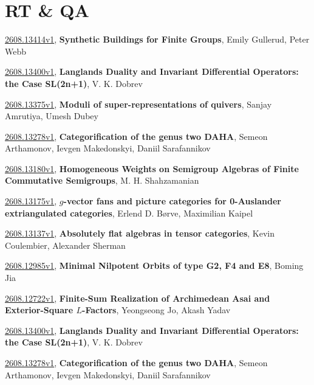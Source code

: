 \documentclass[9pt, a4paper]{article}
\theoremstyle{plain}
\theoremstyle{definition}
\theoremstyle{remark}
\newcommand{\arxiv}[3]{\href{https://arxiv.org/abs/#1}{#1}, \textbf{\textcolor{arxivblue}{#2}}, #3}
\begin{document}
\section{RT \& QA}
\arxiv{2608.13414v1}{Synthetic Buildings for Finite Groups}{Emily Gullerud, Peter Webb}

\arxiv{2608.13400v1}{Langlands Duality and Invariant Differential Operators: the Case SL(2n+1)}{V. K. Dobrev}

\arxiv{2608.13375v1}{Moduli of super-representations of quivers}{Sanjay Amrutiya, Umesh Dubey}

\arxiv{2608.13278v1}{Categorification of the genus two DAHA}{Semeon Arthamonov, Ievgen Makedonskyi, Daniil Sarafannikov}

\arxiv{2608.13180v1}{Homogeneous Weights on Semigroup Algebras of Finite Commutative Semigroups}{M. H. Shahzamanian}

\arxiv{2608.13175v1}{$g$-vector fans and picture categories for 0-Auslander extriangulated categories}{Erlend D. Børve, Maximilian Kaipel}

\arxiv{2608.13137v1}{Absolutely flat algebras in tensor categories}{Kevin Coulembier, Alexander Sherman}

\arxiv{2608.12985v1}{Minimal Nilpotent Orbits of type G2, F4 and E8}{Boming Jia}

\arxiv{2608.12722v1}{Finite-Sum Realization of Archimedean Asai and Exterior-Square $L$-Factors}{Yeongseong Jo, Akash Yadav}

\arxiv{2608.13400v1}{Langlands Duality and Invariant Differential Operators: the Case SL(2n+1)}{V. K. Dobrev}

\arxiv{2608.13278v1}{Categorification of the genus two DAHA}{Semeon Arthamonov, Ievgen Makedonskyi, Daniil Sarafannikov}

\end{document}
